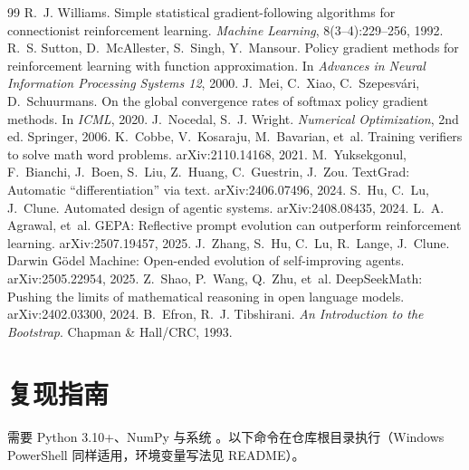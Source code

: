 \documentclass[a4paper,zihao=5,linespread=1.38]{ctexart}
\newcommand{\code}[1]{\texttt{\detokenize{#1}}}
\begin{document}
\begin{thebibliography}{99}
\small
\setlength{\itemsep}{2pt}
 R.~J. Williams. Simple statistical gradient-following algorithms for connectionist reinforcement learning. \emph{Machine Learning}, 8(3–4):229–256, 1992.
 R.~S. Sutton, D.~McAllester, S.~Singh, Y.~Mansour. Policy gradient methods for reinforcement learning with function approximation. In \emph{Advances in Neural Information Processing Systems 12}, 2000.
 J.~Mei, C.~Xiao, C.~Szepesvári, D.~Schuurmans. On the global convergence rates of softmax policy gradient methods. In \emph{ICML}, 2020.
 J.~Nocedal, S.~J. Wright. \emph{Numerical Optimization}, 2nd ed. Springer, 2006.
 K.~Cobbe, V.~Kosaraju, M.~Bavarian, et~al. Training verifiers to solve math word problems. arXiv:2110.14168, 2021.
 M.~Yuksekgonul, F.~Bianchi, J.~Boen, S.~Liu, Z.~Huang, C.~Guestrin, J.~Zou. TextGrad: Automatic “differentiation” via text. arXiv:2406.07496, 2024.
 S.~Hu, C.~Lu, J.~Clune. Automated design of agentic systems. arXiv:2408.08435, 2024.
 L.~A. Agrawal, et~al. GEPA: Reflective prompt evolution can outperform reinforcement learning. arXiv:2507.19457, 2025.
 J.~Zhang, S.~Hu, C.~Lu, R.~Lange, J.~Clune. Darwin Gödel Machine: Open-ended evolution of self-improving agents. arXiv:2505.22954, 2025.
 Z.~Shao, P.~Wang, Q.~Zhu, et~al. DeepSeekMath: Pushing the limits of mathematical reasoning in open language models. arXiv:2402.03300, 2024.
 B.~Efron, R.~J. Tibshirani. \emph{An Introduction to the Bootstrap}. Chapman \& Hall/CRC, 1993.
\end{thebibliography}

\appendix
{}
\section{复现指南}\label{app:repro}
需要 Python 3.10+、NumPy 与系统 \code{curl}。以下命令在仓库根目录执行（Windows PowerShell 同样适用，环境变量写法见 README）。
\end{document}
